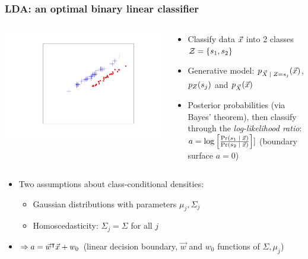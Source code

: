 \begin{frame}
\frametitle{LDA: an optimal binary linear classifier}
\begin{columns}
\begin{column}{.5\linewidth}
\includegraphics[width=\textwidth]{figures/dataNoProjection.pdf} 
\end{column}
\begin{column}{.6\linewidth}
\begin{itemize}
\item Classify data $\vec{x}$ into 2 classes $\mathcal{Z} = \{s_{1}, s_{2}\}$
\item Generative model: $\pdf_{\given{\vaLeakVec}{\sensRandVar = \sensVarValue{j}}}(\vLeakVec)$, $p_{Z}(s_{j})$ and $p_{\vec{X}}(\vec{x})$
\item Posterior probabilities (via Bayes' theorem), then classify through the \emph{log-likelihood ratio}: $a = \log\left[\frac{\prob(\given{\sensVarValue{1}}{\vLeakVec})}{\prob(\given{\sensVarValue{2}}{\vLeakVec})}\right]]$ (boundary surface $a=0$)
\end{itemize}
\end{column}
\end{columns}

\begin{itemize}
\item Two assumptions about class-conditional densities: 
\begin{itemize}
\item Gaussian distributions with parameters $\mu_j, \Sigma_j$
\item Homoscedasticity: $\Sigma_j=\Sigma$ for all $j$
\end{itemize}
\item $\Rightarrow a = \vec{w}^\intercal \vec{x} + w_0$ (linear decision boundary, $\vec{w}$ and $w_0$ functions of $\Sigma, \mu_j$)
\end{itemize}

\end{frame}

